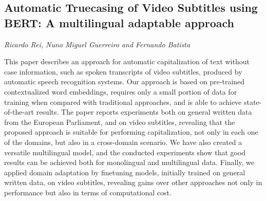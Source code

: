 \documentclass[../booklet.tex]{subfiles}
\begin{document}
\subsection[Automatic Truecasing of Video Subtitles using BERT: A multilingual adaptable approach. {\it Ricardo Rei, Nuno Miguel Guerreiro and Fernando Batista}]{Automatic Truecasing of Video Subtitles using BERT: A multilingual adaptable approach}
  

\begin{center}
  {\it Ricardo Rei, Nuno Miguel Guerreiro and Fernando Batista}
\end{center}


 
This paper describes an approach for automatic capitalization of text without case information, such as spoken transcripts of video subtitles, produced by automatic speech recognition systems. Our approach is based on pre-trained contextualized word embeddings, requires only a small portion of data for training when compared with traditional approaches, and is able to achieve state-of-the-art results. The paper reports experiments both on general written data from the European Parliament, and on video subtitles, revealing that the proposed approach is suitable for performing capitalization, not only in each one of the domains, but also in a cross-domain scenario. We have also created a versatile multilingual model, and the conducted experiments show that good results can be achieved both for monolingual and multilingual data. Finally, we applied domain adaptation by finetuning models, initially trained on general written data, on video subtitles, revealing gains over other approaches not only in performance but also in terms of computational cost.

\end{document}
